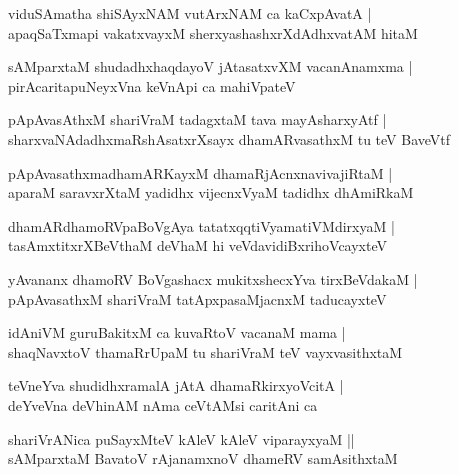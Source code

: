 \documentclass[twoside,12pt,openright]{book}
\newcounter{shloka}[chapter]
\begin{document}
\begin{shloka}%
viduSAmatha shiSAyxNAM vutArxNAM ca kaCxpAvatA |\\
apaqSaTxmapi vakatxvayxM sherxyashashxrXdAdhxvatAM hitaM 
\end{shloka}

\begin{shloka}%
sAMparxtaM shudadhxhaqdayoV jAtasatxvXM vacanAnamxma |\\
pirAcaritapuNeyxVna keVnApi ca mahiVpateV 
\end{shloka}

\begin{shloka}%
pApAvasAthxM shariVraM tadagxtaM tava mayAsharxyAtf |\\
sharxvaNAdadhxmaRshAsatxrXsayx dhamARvasathxM tu teV BaveVtf
\end{shloka}

\begin{shloka}%
pApAvasathxmadhamARKayxM dhamaRjAcnxnavivajiRtaM |\\
aparaM saravxrXtaM yadidhx vijecnxVyaM tadidhx dhAmiRkaM 
\end{shloka}

\begin{shloka}%
dhamARdhamoRVpaBoVgAya tatatxqqtiVyamatiVMdirxyaM |\\
tasAmxtitxrXBeVthaM deVhaM hi veVdavidiBxrihoVcayxteV 
\end{shloka}

\begin{shloka}%
yAvananx dhamoRV BoVgashacx mukitxshecxYva tirxBeVdakaM |\\
pApAvasathxM shariVraM tatApxpasaMjacnxM taducayxteV 
\end{shloka}

\begin{shloka}%
idAniVM guruBakitxM ca kuvaRtoV vacanaM mama |\\
shaqNavxtoV thamaRrUpaM tu shariVraM teV vayxvasithxtaM 
\end{shloka}

\begin{shloka}%
teVneYva shudidhxramalA jAtA dhamaRkirxyoVcitA |\\
deYveVna deVhinAM nAma ceVtAMsi caritAni ca 
\end{shloka}

\begin{shloka}%
shariVrANica puSayxMteV kAleV kAleV viparayxyaM ||\\
sAMparxtaM BavatoV rAjanamxnoV dhameRV samAsithxtaM 
\end{shloka}
\end{document}
